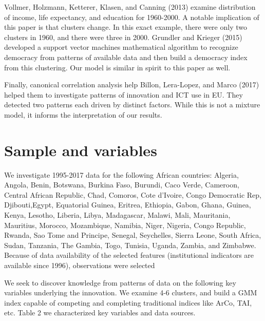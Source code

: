 \documentclass[11pt]{article}
\begin{document}
{Vollmer, Holzmann, Ketterer, Klasen, and Canning (2013) examine distribution of income, life expectancy, and education for 1960-2000. A notable implication of this paper is that clusters change. In this exact example, there were only two clusters in 1960, and there were three in 2000. Grundler and Krieger (2015) developed a support vector machines mathematical algorithm to recognize democracy from patterns of available data and then build a democracy index from this clustering. Our model is similar in spirit to this paper as well.

Finally, canonical correlation analysis help Billon, Lera-Lopez, and Marco (2017) helped them to investigate patterns of innovation and ICT use in EU. They detected two patterns each driven by distinct factors. While this is not a mixture model, it informs the interpretation of our results.

\section{Sample and variables}

We investigate 1995-2017 data for the following African countries: Algeria, Angola, Benin, Botswana, Burkina Faso, Burundi, Caco Verde, Cameroon, Central African Republic, Chad, Comoros, Cote d’Ivoire, Congo Democratic Rep, Djibouti,Egypt, Equatorial Guinea, Eritrea, Ethiopia, Gabon, Ghana, Guinea, Kenya, Lesotho, Liberia, Libya, Madagascar, Malawi, Mali, Mauritania, Mauritius, Morocco, Mozambique, Namibia, Niger, Nigeria, Congo Republic, Rwanda, Sao Tome and Principe, Senegal, Seychelles, Sierra Leone, South Africa, Sudan, Tanzania, The Gambia, Togo, Tunisia, Uganda, Zambia, and Zimbabwe. Because of data availability  of the selected  features (institutional indicators are available since 1996),  observations were selected 


We seek to discover knowledge from patterns of data on the following key variables underlying the innovation. We examine 4-6 clusters, and build a GMM index capable of competing and completing traditional indices like ArCo, TAI, etc. Table 2 we characterized key variables and data sources.


}
\end{document}
